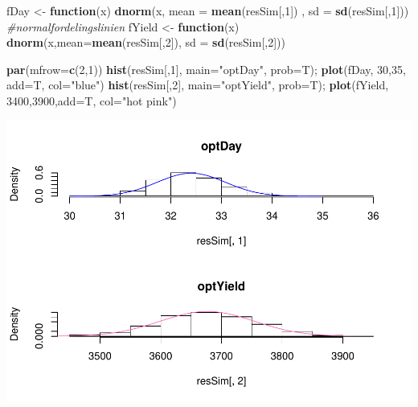 \documentclass[
]{article}
\newenvironment{Shaded}{\begin{snugshade}}{\end{snugshade}}
\newcommand{\CommentTok}[1]{\textcolor[rgb]{0.56,0.35,0.01}{\textit{#1}}}
\newcommand{\ControlFlowTok}[1]{\textcolor[rgb]{0.13,0.29,0.53}{\textbf{#1}}}
\newcommand{\DataTypeTok}[1]{\textcolor[rgb]{0.13,0.29,0.53}{#1}}
\newcommand{\DecValTok}[1]{\textcolor[rgb]{0.00,0.00,0.81}{#1}}
\newcommand{\KeywordTok}[1]{\textcolor[rgb]{0.13,0.29,0.53}{\textbf{#1}}}
\newcommand{\NormalTok}[1]{#1}
\newcommand{\StringTok}[1]{\textcolor[rgb]{0.31,0.60,0.02}{#1}}
\begin{document}
\begin{Shaded}
\begin{Highlighting}[]
\NormalTok{fDay <-}\StringTok{ }\ControlFlowTok{function}\NormalTok{(x) }\KeywordTok{dnorm}\NormalTok{(x, }\DataTypeTok{mean =} \KeywordTok{mean}\NormalTok{(resSim[,}\DecValTok{1}\NormalTok{]) , }\DataTypeTok{sd =} \KeywordTok{sd}\NormalTok{(resSim[,}\DecValTok{1}\NormalTok{])) }\CommentTok{#normalfordelingslinien}
\NormalTok{fYield <-}\StringTok{ }\ControlFlowTok{function}\NormalTok{(x) }\KeywordTok{dnorm}\NormalTok{(x,}\DataTypeTok{mean=}\KeywordTok{mean}\NormalTok{(resSim[,}\DecValTok{2}\NormalTok{]), }\DataTypeTok{sd =} \KeywordTok{sd}\NormalTok{(resSim[,}\DecValTok{2}\NormalTok{]))}


\KeywordTok{par}\NormalTok{(}\DataTypeTok{mfrow=}\KeywordTok{c}\NormalTok{(}\DecValTok{2}\NormalTok{,}\DecValTok{1}\NormalTok{))}
\KeywordTok{hist}\NormalTok{(resSim[,}\DecValTok{1}\NormalTok{], }\DataTypeTok{main=}\StringTok{"optDay"}\NormalTok{, }\DataTypeTok{prob=}\NormalTok{T); }\KeywordTok{plot}\NormalTok{(fDay, }\DecValTok{30}\NormalTok{,}\DecValTok{35}\NormalTok{, }\DataTypeTok{add=}\NormalTok{T, }\DataTypeTok{col=}\StringTok{"blue"}\NormalTok{)}
\KeywordTok{hist}\NormalTok{(resSim[,}\DecValTok{2}\NormalTok{], }\DataTypeTok{main=}\StringTok{"optYield"}\NormalTok{, }\DataTypeTok{prob=}\NormalTok{T); }\KeywordTok{plot}\NormalTok{(fYield, }\DecValTok{3400}\NormalTok{,}\DecValTok{3900}\NormalTok{,}\DataTypeTok{add=}\NormalTok{T, }\DataTypeTok{col=}\StringTok{"hot pink"}\NormalTok{)}
\end{Highlighting}
\end{Shaded}

\begin{center}\includegraphics{matstatproblems20-21_files/figure-latex/unnamed-chunk-60-1} \end{center}
\end{document}

